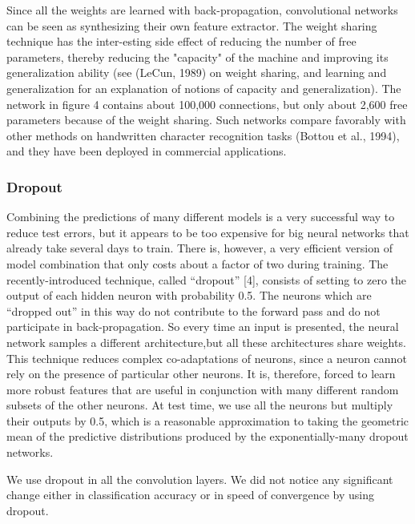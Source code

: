 \documentclass[conference]{IEEEtran}
\begin{document}
Since all the weights are learned with back-propagation, convolutional networks can be seen as synthesizing their own feature extractor. The weight sharing technique has the inter-esting side effect of reducing the number of free parameters, thereby reducing the "capacity" of the machine and improving its generalization ability (see (LeCun, 1989) on weight sharing,
and learning and generalization for an explanation of notions of capacity and generalization). The network in figure 4 contains about 100,000 connections, but only about 2,600 free parameters because of the weight sharing. Such networks compare favorably with
other methods on handwritten character recognition tasks (Bottou et al., 1994), and they have been deployed in commercial applications.

\subsubsection{Dropout}
Combining the predictions of many different models is a very successful way to reduce test errors, but it appears to be too expensive for big neural networks that already take several days to train. There is, however, a very efficient version of model combination that only costs about a factor of two during training. The recently-introduced technique, called “dropout” [4], consists of setting to zero the output of each hidden neuron with probability 0.5. The neurons which are “dropped out” in this way do not contribute to the forward pass and do not participate in back-propagation. So every time an input is presented, the neural network samples a different architecture,but all these architectures share weights. This technique reduces complex co-adaptations of neurons, since a neuron cannot rely on the presence of particular other neurons. It is, therefore, forced to learn more robust features that are useful in conjunction with many different random subsets of the other neurons. At test time, we use all the neurons but multiply their outputs by 0.5, which is a reasonable approximation to taking the geometric mean of the predictive distributions produced by the exponentially-many dropout networks.

We use dropout in all the convolution layers. We did not notice any significant change either in classification accuracy or in speed of convergence by using dropout.
\end{document}
